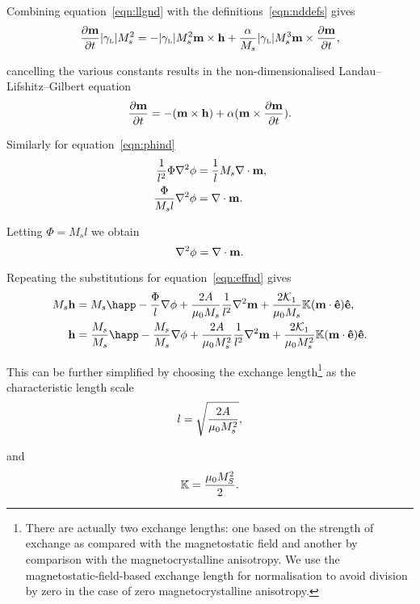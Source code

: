 Combining equation~\eqref{eqn:llgnd} with the definitions~\eqref{eqn:nddefs} gives
\begin{equation}
  \notag
  \frac{\partial \mathbf{m}}{\partial t} {\left|{\gamma_{\text{\tiny{L}}}} \right|} M_s^2 =
  - {\left|{\gamma_{\text{\tiny{L}}}} \right|} M_s^2 \mathbf{m} \times \mathbf{h} + \frac{\alpha}{M_s} {\left|{\gamma_{\text{\tiny{L}}}} \right|} M_s^3 \mathbf{m} \times \frac{\partial \mathbf{m}}{\partial t},
\end{equation}

cancelling the various constants results in the non-dimensionalised Landau--Lifshitz--Gilbert equation
\begin{equation}
  \label{eq:53}
  \frac{\partial \mathbf{m}}{\partial t} = - (\mathbf{m} \times \mathbf{h}) + \alpha (\mathbf{m} \times \frac{\partial \mathbf{m}}{\partial t}).
\end{equation}

Similarly for equation~\eqref{eqn:phind}
\begin{align*}
  \frac{1}{l^2} \Phi \nabla^{2} \phi &= \frac{1}{l} M_s \nabla \cdot \mathbf{m}, \\
  \frac{\Phi}{M_s l} \nabla^{2} \phi &= \nabla \cdot \mathbf{m}.
\end{align*}

Letting $\Phi = M_s l$ we obtain
\begin{equation}
  \label{eq:57}
  \nabla^2 \phi = \nabla \cdot \mathbf{m}.
\end{equation}

Repeating the substitutions for equation~\eqref{eqn:effnd} gives
\begin{align*}
  M_s \hv &= M_s \happ - \frac{\Phi}{l} \nabla \phi + \frac{2 \Exchc }{\mu_0 M_s} \frac{1}{l^2} \lap \mv + \frac{2\kone}{\mu_0 M_s}  \nK (\mv \cdot \ev) \ev, \\
  \hv &= \frac{M_s}{M_s} \happ - \frac{M_s}{M_s} \nabla \phi + \frac{2 \Exchc}{\mu_0 M_s^2} \frac{1}{l^2} \lap \mv + \frac{2\kone}{\mu_0 M_s^2} \nK (\mv \cdot \ev) \ev.
\end{align*}

This can be further simplified by choosing the exchange length\footnote{There are actually two exchange lengths: one based on the strength of exchange as compared with the magnetostatic field and another by comparison with the magnetocrystalline anisotropy. We use the magnetostatic-field-based exchange length for normalisation to avoid division by zero in the case of zero magnetocrystalline anisotropy.} as the characteristic length scale
\begin{equation}
  \label{eqn:l-normalisation}
  l = \sqrt{ \frac{2 A}{\mu_0 M_s^2} },
\end{equation}

and
\begin{equation}
  \label{k-normalisation}
  \mathbb{K} = \frac{ \mu_0 M_S^2}{2}.
\end{equation}

